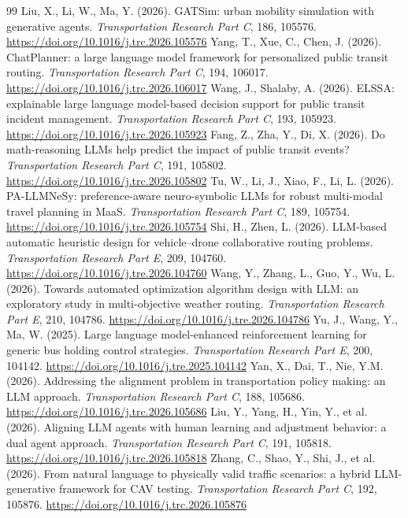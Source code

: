 \documentclass[preprint,12pt,letterpaper]{elsarticle}
\theoremstyle{definition}
\theoremstyle{plain}
\begin{document}
\begin{thebibliography}{99}
 Liu, X., Li, W., Ma, Y. (2026). GATSim: urban mobility simulation with generative agents. \textit{Transportation Research Part C}, 186, 105576. \url{https://doi.org/10.1016/j.trc.2026.105576}
 Yang, T., Xue, C., Chen, J. (2026). ChatPlanner: a large language model framework for personalized public transit routing. \textit{Transportation Research Part C}, 194, 106017. \url{https://doi.org/10.1016/j.trc.2026.106017}
 Wang, J., Shalaby, A. (2026). ELSSA: explainable large language model-based decision support for public transit incident management. \textit{Transportation Research Part C}, 193, 105923. \url{https://doi.org/10.1016/j.trc.2026.105923}
 Fang, Z., Zha, Y., Di, X. (2026). Do math-reasoning LLMs help predict the impact of public transit events? \textit{Transportation Research Part C}, 191, 105802. \url{https://doi.org/10.1016/j.trc.2026.105802}
 Tu, W., Li, J., Xiao, F., Li, L. (2026). PA-LLMNeSy: preference-aware neuro-symbolic LLMs for robust multi-modal travel planning in MaaS. \textit{Transportation Research Part C}, 189, 105754. \url{https://doi.org/10.1016/j.trc.2026.105754}
 Shi, H., Zhen, L. (2026). LLM-based automatic heuristic design for vehicle--drone collaborative routing problems. \textit{Transportation Research Part E}, 209, 104760. \url{https://doi.org/10.1016/j.tre.2026.104760}
 Wang, Y., Zhang, L., Guo, Y., Wu, L. (2026). Towards automated optimization algorithm design with LLM: an exploratory study in multi-objective weather routing. \textit{Transportation Research Part E}, 210, 104786. \url{https://doi.org/10.1016/j.tre.2026.104786}
 Yu, J., Wang, Y., Ma, W. (2025). Large language model-enhanced reinforcement learning for generic bus holding control strategies. \textit{Transportation Research Part E}, 200, 104142. \url{https://doi.org/10.1016/j.tre.2025.104142}
 Yan, X., Dai, T., Nie, Y.M. (2026). Addressing the alignment problem in transportation policy making: an LLM approach. \textit{Transportation Research Part C}, 188, 105686. \url{https://doi.org/10.1016/j.trc.2026.105686}
 Liu, Y., Yang, H., Yin, Y., et al. (2026). Aligning LLM agents with human learning and adjustment behavior: a dual agent approach. \textit{Transportation Research Part C}, 191, 105818. \url{https://doi.org/10.1016/j.trc.2026.105818}
 Zhang, C., Shao, Y., Shi, J., et al. (2026). From natural language to physically valid traffic scenarios: a hybrid LLM-generative framework for CAV testing. \textit{Transportation Research Part C}, 192, 105876. \url{https://doi.org/10.1016/j.trc.2026.105876}

\end{thebibliography}
\end{document}
